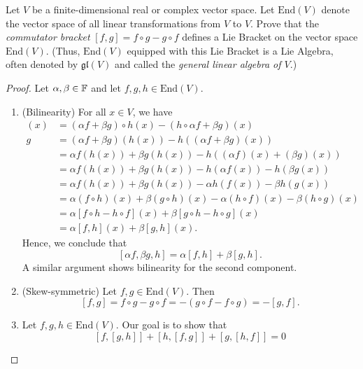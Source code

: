 \documentclass[a4paper]{article}
\begin{document}
\begin{problem}
    Let \( V  \) be a finite-dimensional real or complex vector space. Let \( \text{End}(V)  \) denote the vector space of all linear transformations from \( V  \) to  \( V  \). Prove that the \textit{commutator bracket} \( [f,g] = f \circ g - g \circ  f \) defines a Lie Bracket on the vector space \( \text{End}(V)  \). (Thus, \( \text{End}(V)   \) equipped with this Lie Bracket is a Lie Algebra, often denoted by \( \mathfrak{g} \mathfrak{l}(V) \) and called the \textit{general linear algebra of \( V \)}.) 
\end{problem}
\begin{proof}
Let \( \alpha , \beta \in \mathbb{F}  \) and let \( f,g,h \in \text{End}(V)  \). 
\begin{enumerate}
    \item[(i)] (Bilinearity) For all \( x \in V  \), we have 
\begin{align*}
    [\alpha f + \beta g , h ](x) &= (\alpha f + \beta g ) \circ h (x) - (h \circ \alpha f + \beta g ) (x) \\ g
                                 &= (\alpha f + \beta g ) (h(x)) - h((\alpha f + \beta g )(x)) \\
                                 &= \alpha f (h(x)) + \beta g (h(x)) - h((\alpha f)(x) + (\beta g)(x)) \\
                                 &= \alpha f (h(x)) + \beta g (h(x)) - h(\alpha f (x)) - h(\beta  g(x)) \\
                                 &= \alpha f(h(x)) + \beta g(h(x)) - \alpha h(f(x)) - \beta h(g(x)) \\
                                 &= \alpha (f \circ h)(x) + \beta(g \circ h)(x) - \alpha (h \circ f)(x) - \beta (h \circ g)(x) \\
                                 &= \alpha [f \circ h - h \circ f](x) + \beta[g \circ h - h \circ g](x) \\
                                 &= \alpha [f,h](x) + \beta [g,h](x).
\end{align*}
Hence, we conclude that
\[  [\alpha f , \beta g , h ] = \alpha [f,h] + \beta [g,h]. \]
A similar argument shows bilinearity for the second component.
    \item[(ii)] (Skew-symmetric) Let \( f,g \in \text{End}(V)  \). Then 
        \[  [f,g] = f \circ g - g \circ f  =  - (g \circ f - f \circ g) = -[g,f]. \]
    \item[(iii)] Let \( f,g,h \in \text{End}(V)  \). Our goal is to show that
        \[  [f,[g,h]] + [h,[f,g]] + [g,[h,f]] = 0  \]

\end{enumerate}
\end{proof}
\end{document}
